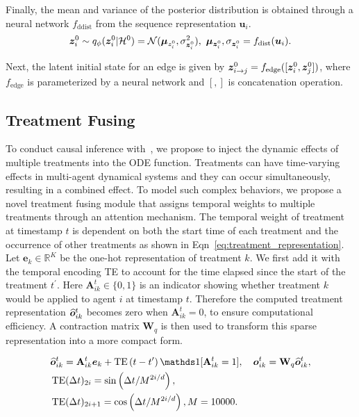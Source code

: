 Finally, the mean and variance of the posterior distribution is obtained through a neural network $f_{\text{ddist}}$ from the sequence representation $\bm{u}_i$.
\begin{align*}
    \bm{z}_i^0\sim q_\phi(\bm{z}_i^0 | \mathcal{H}^0)=\mathcal{N}(\bm{\mu}_{z_i^0}, \sigma_{\bm{z}_i^0}^2),~ \bm{\mu}_{\bm{z}_i^0},\sigma_{\bm{z}_i^0} = f_{\text{dist}}(\bm{u}_i).
\end{align*}

Next, the latent initial state for an edge is given by $\bm{z}_{i\rightarrow j}^0 = f_{\text{edge}}([\bm{z}_i^0, \bm{z}_j^0])$,
where $f_{\text{edge}}$ is parameterized by a neural network and $[,]$ is concatenation operation.

\subsection{Treatment Fusing}
To conduct causal inference with~\model, we propose to inject the dynamic effects of multiple treatments into the ODE function. Treatments can have time-varying effects in multi-agent dynamical systems and they can occur simultaneously, resulting in a combined effect.  To model such complex behaviors, we propose a novel treatment fusing module that assigns temporal weights to multiple treatments through an attention mechanism. The temporal weight of treatment at timestamp $t$ is dependent on both the start time of each treatment and the occurrence of other treatments as shown in Eqn~\eqref{eq:treatment_representation}. Let $\bm{e}_k\in\mathbb{R}^K$ be the one-hot representation of treatment $k$. We first add it with the temporal encoding TE\cite{huang2021coupled, attention} to account for the time elapsed since the start of the treatment $t^\prime$. Here $\mathbf{A}_{ik}^{t}\in \{0,1\}$ is an indicator showing whether treatment $k$ would be applied to agent $i$ at timestamp $t$. Therefore the computed treatment representation $\widehat{\bm{o}}_{ik}^{t}$ becomes zero when $\mathbf{A}_{ik}^{t} = 0$, to ensure computational efficiency. A contraction matrix $\mathbf{W}_q$ is then used to transform this sparse representation into a more compact form.

\begin{equation}\label{eq:treatment_representation}
\begin{aligned}
& \hat{\bo}_{ik}^{t}=\mathbf{A}_{ik}^t \be_k+\mathrm{TE}\left(t-t^{\prime}\right)\ind[\mathbf{A}_{ik}^t = 1],\quad \bo_{ik}^{t}  = \mathbf{W}_q \hat{\bo}_{ik}^{t}, \\
& \operatorname{TE}(\Delta t)_{2 i}=\sin \left(\Delta t / M^{2 i / d}\right), \\
&\operatorname{TE}(\Delta t)_{2 i+1}=\cos \left(\Delta t / M^{2 i / d}\right),M=10000.
\end{aligned}
\end{equation}

